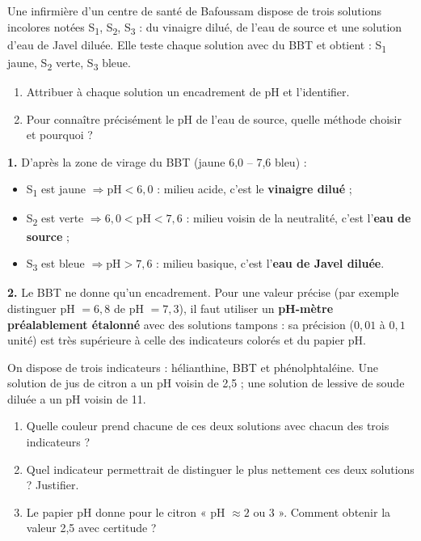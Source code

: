 \documentclass[11pt]{article}
\begin{document}
\begin{exoresolu}
Une infirmière d'un centre de santé de Bafoussam dispose de trois solutions incolores notées S\textsubscript{1}, S\textsubscript{2}, S\textsubscript{3} : du vinaigre dilué, de l'eau de source et une solution d'eau de Javel diluée. Elle teste chaque solution avec du BBT et obtient : S\textsubscript{1} jaune, S\textsubscript{2} verte, S\textsubscript{3} bleue.
\begin{enumerate}
\item Attribuer à chaque solution un encadrement de pH et l'identifier.
\item Pour connaître précisément le pH de l'eau de source, quelle méthode choisir et pourquoi ?
\end{enumerate}
\tcblower
\textbf{1.} D'après la zone de virage du BBT (jaune 6,0 -- 7,6 bleu) :
\begin{itemize}
\item S\textsubscript{1} est jaune $\Rightarrow \mathrm{pH} < 6{,}0$ : milieu acide, c'est le \textbf{vinaigre dilué} ;
\item S\textsubscript{2} est verte $\Rightarrow 6{,}0 < \mathrm{pH} < 7{,}6$ : milieu voisin de la neutralité, c'est l'\textbf{eau de source} ;
\item S\textsubscript{3} est bleue $\Rightarrow \mathrm{pH} > 7{,}6$ : milieu basique, c'est l'\textbf{eau de Javel diluée}.
\end{itemize}
\textbf{2.} Le BBT ne donne qu'un encadrement. Pour une valeur précise (par exemple distinguer pH $= 6{,}8$ de pH $= 7{,}3$), il faut utiliser un \textbf{pH-mètre préalablement étalonné} avec des solutions tampons : sa précision ($0,01$ à $0,1$ unité) est très supérieure à celle des indicateurs colorés et du papier pH.
\end{exoresolu}

\begin{exercice}
On dispose de trois indicateurs : hélianthine, BBT et phénolphtaléine. Une solution de jus de citron a un pH voisin de 2,5 ; une solution de lessive de soude diluée a un pH voisin de 11.
\begin{enumerate}
\item Quelle couleur prend chacune de ces deux solutions avec chacun des trois indicateurs ?
\item Quel indicateur permettrait de distinguer le plus nettement ces deux solutions ? Justifier.
\item Le papier pH donne pour le citron « pH $\approx 2$ ou 3 ». Comment obtenir la valeur 2,5 avec certitude ?
\end{enumerate}
\end{exercice}
\end{document}
